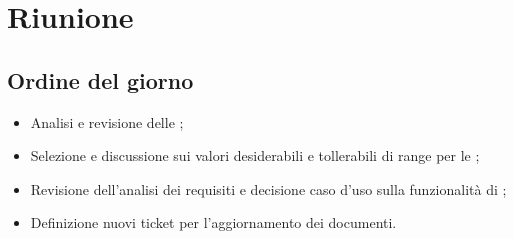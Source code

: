 \section{Riunione}
\subsection{Ordine del giorno}
\begin{itemize}
	\item Analisi e revisione delle ;
	\item Selezione e discussione sui valori desiderabili e tollerabili di range per le ;
	\item Revisione dell’analisi dei requisiti e decisione caso d’uso sulla funzionalità di ;
	\item Definizione nuovi ticket per l'aggiornamento dei documenti.
\end{itemize}

